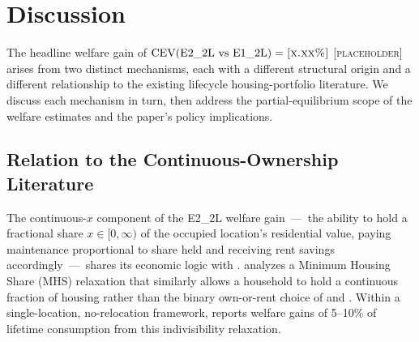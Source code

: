 %
%
%

\section{Discussion}
\label{sec:discussion}

The headline welfare gain of
$\operatorname{CEV}(\text{E2\_2L vs E1\_2L}) = \textsc{[x.xx\%]}$
[\textsc{placeholder}]
arises from two distinct mechanisms, each with a different structural origin
and a different relationship to the existing lifecycle housing-portfolio
literature.
We discuss each mechanism in turn, then address the partial-equilibrium
scope of the welfare estimates and the paper's policy implications.

\subsection{Relation to the Continuous-Ownership Literature}
\label{sec:discussion:liu}

The continuous-$x$ component of the E2\_2L welfare gain~---~the ability to
hold a fractional share $x \in [0,\infty)$ of the occupied location's
residential value, paying maintenance proportional to share held and receiving
rent savings accordingly~---~shares its economic logic with \citet{Liu2021}.
\citeauthor{Liu2021} analyzes a Minimum Housing Share (MHS) relaxation that
similarly allows a household to hold a continuous fraction of housing rather
than the binary own-or-rent choice of \citet{YaoZhang2005} and \citet{Cocco2005}.
Within a single-location, no-relocation framework, \citeauthor{Liu2021} reports
welfare gains of 5--10\% of lifetime consumption from this indivisibility
relaxation.

